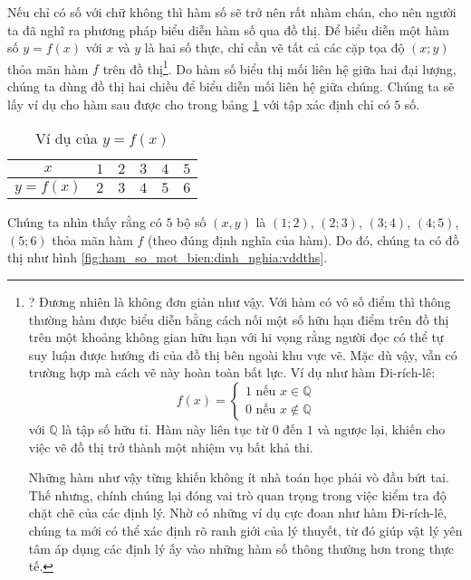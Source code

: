 Nếu chỉ có số với chữ không thì hàm số sẽ trở nên rất nhàm chán, cho nên người ta đã nghĩ ra phương pháp biểu diễn hàm số qua đồ thị. Để biểu diễn một hàm số $y=f(x)$ với $x$ và $y$ là hai số thực, chỉ cần vẽ tất cả các cặp tọa độ $(x; y)$ thỏa mãn hàm $f$ trên đồ thị\footnote{? Đương nhiên là không đơn giản như vậy. Với hàm có vô số điểm thì thông thường hàm được biểu diễn bằng cách nối một số hữu hạn điểm trên đồ thị trên một khoảng không gian hữu hạn với hi vọng rằng người đọc có thể tự suy luận được hướng đi của đồ thị bên ngoài khu vực vẽ. Mặc dù vậy, vẫn có trường hợp mà cách vẽ này hoàn toàn bất lực. Ví dụ như hàm Đi-rích-lê: $$f(x) =
\begin{cases}
   1 \text{ nếu } x\in \mathbb{Q} \\
   0 \text{ nếu } x\notin \mathbb{Q}
\end{cases}$$ với $\mathbb{Q}$ là tập số hữu tỉ. Hàm này liên tục  từ $0$ đến $1$ và ngược lại, khiến cho việc vẽ đồ thị trở thành một nhiệm vụ bất khả thi.

Những hàm  như vậy từng khiến không ít nhà toán học phải vò đầu bứt tai. Thế nhưng, chính chúng lại đóng vai trò quan trọng trong việc kiểm tra độ chặt chẽ của các định lý. Nhờ có những ví dụ cực đoan như hàm Đi-rích-lê, chúng ta mới có thể xác định rõ ranh giới của lý thuyết, từ đó giúp vật lý yên tâm áp dụng các định lý ấy vào những hàm số thông thường hơn trong thực tế.}. Do hàm số biểu thị mối liên hệ giữa hai đại lượng, chúng ta dùng đồ thị hai chiều để biểu diễn mối liên hệ giữa chúng. Chúng ta sẽ lấy ví dụ cho hàm sau được cho trong bảng \ref{tab:ham_so_mot_bien:dinh_nghia:vddths} với tập xác định chỉ có $5$ số.

\begin{table}[h]
   \centering
   \begin{tabular}{|c|c|c|c|c|c|}
      \hline
      $x$ & $1$ & $2$ & $3$ & $4$ & $5$ \\
      \hline
      $y=f(x)$ & $2$ & $3$ & $4$ & $5$ & $6$ \\
      \hline
   \end{tabular}
   \caption{Ví dụ của $y = f(x)$}
   \label{tab:ham_so_mot_bien:dinh_nghia:vddths}
\end{table}

\noindent Chúng ta nhìn thấy rằng có $5$ bộ số $(x,y)$ là $(1;2)$, $(2;3)$, $(3;4)$, $(4;5)$, $(5;6)$ thỏa mãn hàm $f$ (theo đúng định nghĩa của hàm). Do đó, chúng ta có đồ thị như hình \ref{fig:ham_so_mot_bien:dinh_nghia:vddths}. 

